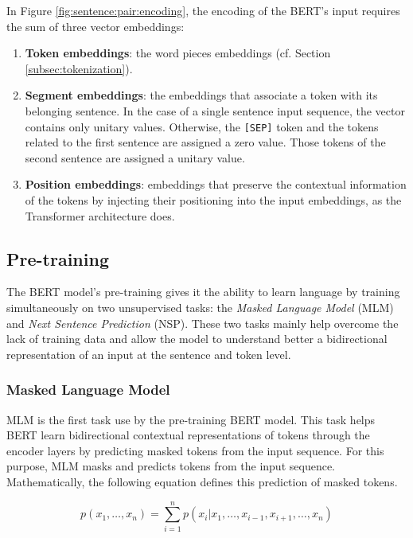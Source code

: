 In Figure \ref{fig:sentence:pair:encoding}, the encoding of the BERT's input
requires the sum of three vector embeddings:
\begin{enumerate}
\item \textbf{Token embeddings}: the word pieces embeddings (cf. Section
\ref{subsec:tokenization}).
\item \textbf{Segment embeddings}: the embeddings that associate a token with
its belonging sentence. In the case of a single sentence input sequence, the
vector contains only unitary values. Otherwise, the \texttt{[SEP]} token and the
tokens related to the first sentence are assigned a zero value. Those tokens of
the second sentence are assigned a unitary value.
\item \textbf{Position embeddings}: embeddings that preserve the contextual
information of the tokens by injecting their positioning into the input
embeddings, as the Transformer architecture does.
\end{enumerate}

\subsection{Pre-training}
\label{subsec:bert:pre-training}


The BERT model's pre-training gives it the ability to learn language by training
simultaneously on two unsupervised tasks: the \emph{Masked Language Model} (MLM)
and \emph{Next Sentence Prediction} (NSP). These two tasks mainly help overcome
the lack of training data and allow the model to understand better a
bidirectional representation of an input at the sentence and token level.

\subsubsection{Masked Language Model}
\label{subsubsec:bert:mlm}

MLM is the first task use by the pre-training BERT model. This task helps BERT
learn bidirectional contextual representations of tokens through the encoder
layers by predicting masked tokens from the input sequence. For this purpose,
MLM masks and predicts tokens from the input sequence. Mathematically, the
following equation defines this prediction of masked tokens.

\begin{equation}
  p\left(x_1,\dotsc,x_n\right) = \sum_{i = 1}^np\left(x_i|x_1,\dotsc,x_{i - 1}, x_{i + 1},\dotsc, x_n\right)
\label{eq:def:mlm}
\end{equation}

